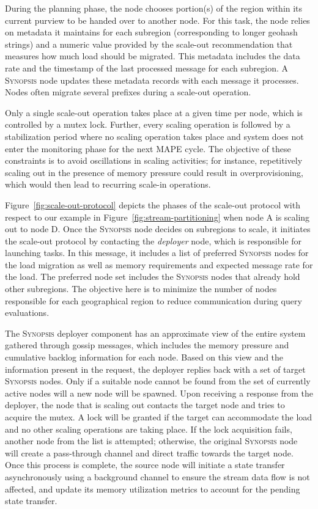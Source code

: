 During the planning phase, the node chooses portion(s) of the region within its current purview to be handed over to another node.
For this task, the node relies on metadata it maintains for each subregion (corresponding to longer geohash strings) and a numeric value provided by the scale-out recommendation that measures how much load should be migrated.
This metadata includes the data rate and the timestamp of the last processed message for each subregion.
A \textsc{Synopsis} node updates these metadata records with each message it processes.
Nodes often migrate several prefixes during a scale-out operation.

Only a single scale-out operation takes place at a given time per node, which is controlled by a mutex lock.
Further, every scaling operation is followed by a stabilization period where no scaling operation takes place and system does not enter the monitoring phase for the next MAPE cycle.
The objective of these constraints is to avoid oscillations in scaling activities; for instance, repetitively scaling out in the presence of memory pressure could result in overprovisioning, which would then lead to recurring scale-in operations.
%

Figure~\ref{fig:scale-out-protocol} depicts the phases of the scale-out protocol with respect to our example in Figure~\ref{fig:stream-partitioning} when node A is scaling out to node D.
Once the \textsc{Synopsis} node decides on subregions to scale, it initiates the scale-out protocol by contacting the \emph{deployer} node, which is responsible for launching tasks.
In this message, it includes a list of preferred \textsc{Synopsis} nodes for the load migration as well as memory requirements and expected message rate for the load.
The preferred node set includes the \textsc{Synopsis} nodes that already hold other subregions.
The objective here is to minimize the number of nodes responsible for each geographical region to reduce communication during query evaluations.

The \textsc{Synopsis} deployer component has an approximate view of the entire system gathered through gossip messages, which includes the memory pressure and cumulative backlog information for each node.
Based on this view and the information present in the request, the deployer replies back with a set of target \textsc{Synopsis} nodes.
Only if a suitable node cannot be found from the set of currently active nodes will a new node will be spawned.
Upon receiving a response from the deployer, the node that is scaling out contacts the target node and tries to acquire the mutex.
A lock will be granted if the target can accommodate the load and no other scaling operations are taking place.
If the lock acquisition fails, another node from the list is attempted; otherwise, the original \textsc{Synopsis} node will create a pass-through channel and direct traffic towards the target node.
Once this process is complete, the source node will initiate a state transfer asynchronously using a background channel to ensure the stream data flow is not affected, and update its memory utilization metrics to account for the pending state transfer.

